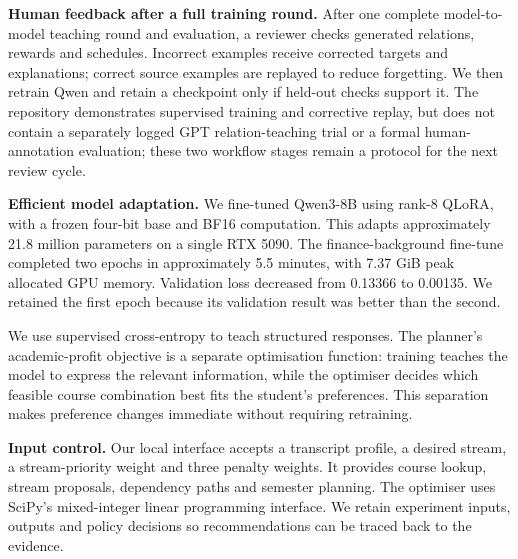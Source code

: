 \documentclass{article}
\begin{document}
\textbf{Human feedback after a full training round.} After one complete model-to-model teaching round and evaluation, a reviewer checks generated relations, rewards and schedules. Incorrect examples receive corrected targets and explanations; correct source examples are replayed to reduce forgetting. We then retrain Qwen and retain a checkpoint only if held-out checks support it. The repository demonstrates supervised training and corrective replay, but does not contain a separately logged GPT relation-teaching trial or a formal human-annotation evaluation; these two workflow stages remain a protocol for the next review cycle.

\textbf{Efficient model adaptation.} We fine-tuned Qwen3-8B\citep{qwen} using rank-8 QLoRA\citep{qlora}, with a frozen four-bit base and BF16 computation. This adapts approximately 21.8 million parameters on a single RTX 5090. The finance-background fine-tune completed two epochs in approximately 5.5 minutes, with 7.37 GiB peak allocated GPU memory. Validation loss decreased from 0.13366 to 0.00135. We retained the first epoch because its validation result was better than the second.

We use supervised cross-entropy to teach structured responses. The planner's academic-profit objective is a separate optimisation function: training teaches the model to express the relevant information, while the optimiser decides which feasible course combination best fits the student's preferences. This separation makes preference changes immediate without requiring retraining.

\textbf{Input control.} Our local interface accepts a transcript profile, a desired stream, a stream-priority weight and three penalty weights. It provides course lookup, stream proposals, dependency paths and semester planning. The optimiser uses SciPy's mixed-integer linear programming interface\citep{scipy}. We retain experiment inputs, outputs and policy decisions so recommendations can be traced back to the evidence\citep{runs}.
\end{document}
